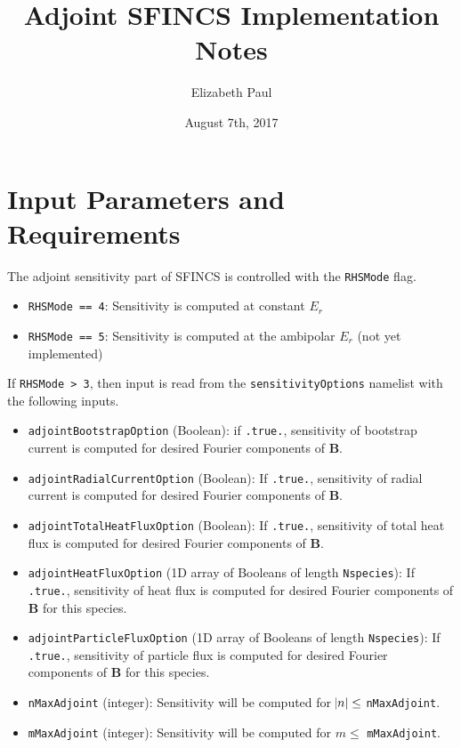 \documentclass[11pt]{amsart}
\begin{document}
\title{Adjoint SFINCS Implementation Notes}
\author{Elizabeth Paul}
\date{August 7th, 2017}

\maketitle

\section{Input Parameters and Requirements}

The adjoint sensitivity part of SFINCS is controlled with the \texttt{RHSMode} flag. 
\begin{itemize}
\item \texttt{RHSMode == 4}: Sensitivity is computed at constant $E_r$
\item \texttt{RHSMode == 5}: Sensitivity is computed at the ambipolar $E_r$ (not yet implemented)
\end{itemize} 
If \texttt{RHSMode > 3}, then input is read from the \texttt{sensitivityOptions} namelist with the following inputs.
\begin{itemize}
\item \texttt{adjointBootstrapOption} (Boolean): if \texttt{.true.}, sensitivity of bootstrap current is computed for desired Fourier components of $\bm{B}$. 
\item \texttt{adjointRadialCurrentOption} (Boolean): If \texttt{.true.}, sensitivity of radial current is computed for desired Fourier components of $\bm{B}$. 
\item \texttt{adjointTotalHeatFluxOption} (Boolean): If \texttt{.true.}, sensitivity of total heat flux is computed for desired Fourier components of $\bm{B}$. 
\item \texttt{adjointHeatFluxOption} (1D array of Booleans of length \texttt{Nspecies}): If \texttt{.true.}, sensitivity of heat flux is computed for desired Fourier components of $\bm{B}$ for this species. 
\item \texttt{adjointParticleFluxOption} (1D array of Booleans of length \texttt{Nspecies}): If \texttt{.true.}, sensitivity of particle flux is computed for desired Fourier components of $\bm{B}$ for this species. 
\item \texttt{nMaxAdjoint} (integer): Sensitivity will be computed for $\abs{n} \leq$ \texttt{nMaxAdjoint}.
\item \texttt{mMaxAdjoint} (integer): Sensitivity will be computed for $m \leq$ \texttt{mMaxAdjoint}.
\end{itemize}
\end{document}
